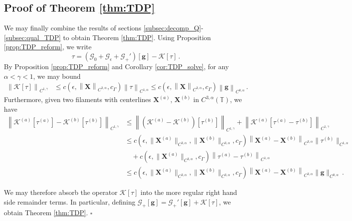 \documentclass[11pt,reqno]{amsart}
\newcommand{\T}{\mathbb{T}}
\newcommand{\X}{\bm{X}}
\newcommand{\norm}[1]{\left\lVert #1 \right\rVert}
\newcommand{\mc}[1]{\mathcal{#1}}
\theoremstyle{definition}
\begin{document}
\subsection{Proof of Theorem \ref{thm:TDP}}\label{subsec:pf_TDP}
We may finally combine the results of sections \ref{subsec:decomp_Q}-\ref{subsec:qual_TDP} to obtain Theorem \ref{thm:TDP}.
%
%
Using Proposition \ref{prop:TDP_reform}, we write
\begin{equation}
\tau = (\mc{G}_0+\mc{G}_\epsilon+\mc{G}_+')[\bm{g}] - \mc{K}[\tau]\,.
\end{equation}
%
By Proposition \ref{prop:TDP_reform} and Corollary \ref{cor:TDP_solve}, for any $\alpha<\gamma<1$, we may bound 
\begin{equation}
\begin{aligned}
  \norm{\mc{K}[\tau]}_{C^{1,\gamma}} &\le c(\epsilon,\norm{\X}_{C^{3,\alpha}},c_\Gamma)\norm{\tau}_{C^{1,\alpha}} 
  \le c(\epsilon,\norm{\X}_{C^{3,\alpha}},c_\Gamma)\norm{\bm{g}}_{C^{0,\alpha}}\,.
\end{aligned}
\end{equation}
%
%
Furthermore, given two filaments with centerlines $\X^{(a)}$, $\X^{(b)}$ in $C^{3,\alpha}(\T)$, we have 
\begin{equation}
\begin{aligned}
  \norm{\mc{K}^{(a)}[\tau^{(a)}]-\mc{K}^{(b)}[\tau^{(b)}]}_{C^{1,\gamma}} &\le \norm{(\mc{K}^{(a)}-\mc{K}^{(b)})[\tau^{(b)}]}_{C^{1,\gamma}} + \norm{\mc{K}^{(a)}[\tau^{(a)}-\tau^{(b)}]}_{C^{1,\gamma}} \\
  &\le c(\epsilon,\|\X^{(a)}\|_{C^{3,\alpha}},\|\X^{(b)}\|_{C^{3,\alpha}},c_\Gamma)\norm{\X^{(a)}-\X^{(b)}}_{C^{3,\alpha}}\|\tau^{(b)}\|_{C^{1,\alpha}}\\
  &\quad + c(\epsilon,\|\X^{(a)}\|_{C^{3,\alpha}},c_\Gamma)\norm{\tau^{(a)}-\tau^{(b)}}_{C^{1,\alpha}}\\
  &\le c(\epsilon,\|\X^{(a)}\|_{C^{3,\alpha}},\|\X^{(b)}\|_{C^{3,\alpha}},c_\Gamma)\norm{\X^{(a)}-\X^{(b)}}_{C^{3,\alpha}}\|\bm{g}\|_{C^{0,\alpha}}\,.
\end{aligned}
\end{equation}

We may therefore absorb the operator $\mc{K}[\tau]$ into the more regular right hand side remainder terms. In particular, defining $\mc{G}_+[\bm{g}]= \mc{G}_+'[\bm{g}]+\mc{K}[\tau]$, we obtain Theorem \ref{thm:TDP}. 
%
%
%
\hfill $\square$
\end{document}

